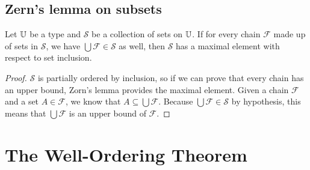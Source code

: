 \documentclass[../math.tex]{subfiles}
\begin{document}
\subsection{Zern's lemma on subsets}

\begin{theorem} \label{set_zorn}
    Let $\mathbb{U}$ be a type and $\mathcal S$ be a collection of sets on $\mathbb{U}$.  If
    for every chain $\mathcal F$ made up of sets in $\mathcal S$, we have
    $\bigcup \mathcal F \in \mathcal S$ as well, then $\mathcal S$ has a maximal
    element with respect to set inclusion.
\end{theorem}
\begin{proof}
    $\mathcal S$ is partially ordered by inclusion, so if we can prove that
    every chain has an upper bound, Zorn's lemma provides the maximal element.
    Given a chain $\mathcal F$ and a set $A \in \mathcal F$, we know that $A
    \subseteq \bigcup \mathcal F$.  Because $\bigcup \mathcal F \in \mathcal S$
    by hypothesis, this means that $\bigcup \mathcal F$ is an upper bound of
    $\mathcal F$.
\end{proof}

\section{The Well-Ordering Theorem}
\end{document}
